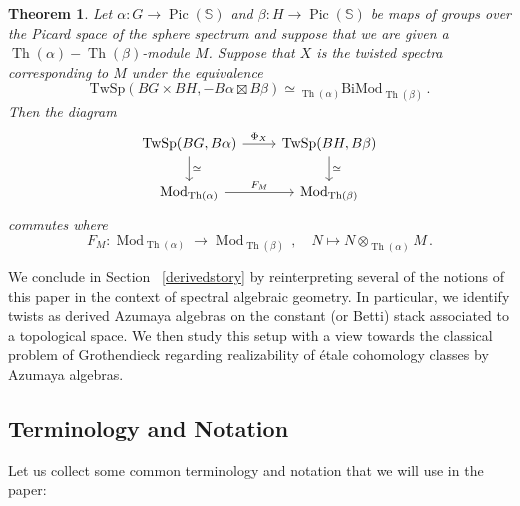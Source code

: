 \documentclass[10pt]{amsart}
\newcommand{\longto}{\longrightarrow}
\theoremstyle{plain}
\newtheorem{theorem}{Theorem}[subsection]
\theoremstyle{definition}
\DeclareMathOperator{\Mod}{Mod}
\DeclareMathOperator{\Th}{Th}
\DeclareMathOperator{\Pic}{Pic}
\newcommand{\bS}{\mathbb{S}}
\newcommand{\TwSp}{\mathrm{TwSp}}
\begin{document}
\begin{theorem}
  Let $\alpha : G \to \Pic(\bS)$ and $\beta : H \to \Pic(\bS)$ be maps of groups over the Picard space of the sphere spectrum and suppose that we are given a $\Th(\alpha) - \Th(\beta)$-module $M$. Suppose that  $X$ is the twisted spectra corresponding to $M$ under the equivalence
  \[
  \TwSp(BG \times BH , -B\alpha \boxtimes B\beta) \simeq {}_{\Th(\alpha)} \mathrm{BiMod}_{\Th(\beta)} \,.
  \]
  Then the diagram
  \[
  \begin{tikzcd}
  \TwSp(BG, B\alpha) \arrow[r,"\Phi_X"] \arrow[d,"\simeq"] & \TwSp(BH,B\beta) \arrow[d,"\simeq"] \\
  \Mod_{\Th(\alpha)}  \arrow[r,"F_M"] & \Mod_{\Th(\beta)}
  \end{tikzcd}
  \]
  commutes where
  \[
  F_M : \Mod_{\Th(\alpha)} \longto \Mod_{\Th(\beta)} \,, \quad N \mapsto N \otimes_{\Th(\alpha)} M \,.
  \]
\end{theorem}

We conclude in Section ~\ref{derivedstory} by reinterpreting several of the notions of this paper in the context of spectral algebraic geometry.
In particular, we identify twists as derived Azumaya algebras on the constant (or Betti) stack associated to a topological space.
We then study this setup with a view towards the classical problem of Grothendieck regarding realizability of \'{e}tale cohomology classes by Azumaya algebras.

\subsection*{Terminology and Notation}

Let us collect some common terminology and notation that we will use in the paper:
\end{document}
